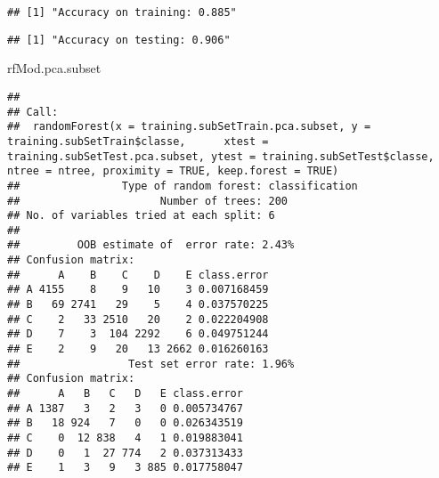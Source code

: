 \documentclass[]{article}
\newenvironment{Shaded}{\begin{snugshade}}{\end{snugshade}}
\newcommand{\DecValTok}[1]{\textcolor[rgb]{0.00,0.00,0.81}{#1}}
\newcommand{\KeywordTok}[1]{\textcolor[rgb]{0.13,0.29,0.53}{\textbf{#1}}}
\newcommand{\NormalTok}[1]{#1}
\newcommand{\OperatorTok}[1]{\textcolor[rgb]{0.81,0.36,0.00}{\textbf{#1}}}
\newcommand{\StringTok}[1]{\textcolor[rgb]{0.31,0.60,0.02}{#1}}
\begin{document}
\begin{Shaded}
\end{Shaded}

\begin{verbatim}
## [1] "Accuracy on training: 0.885"
\end{verbatim}

\begin{Shaded}
\end{Shaded}

\begin{verbatim}
## [1] "Accuracy on testing: 0.906"
\end{verbatim}

\begin{Shaded}
\begin{Highlighting}[]
\NormalTok{rfMod.pca.subset}
\end{Highlighting}
\end{Shaded}

\begin{verbatim}
## 
## Call:
##  randomForest(x = training.subSetTrain.pca.subset, y = training.subSetTrain$classe,      xtest = training.subSetTest.pca.subset, ytest = training.subSetTest$classe,      ntree = ntree, proximity = TRUE, keep.forest = TRUE) 
##                Type of random forest: classification
##                      Number of trees: 200
## No. of variables tried at each split: 6
## 
##         OOB estimate of  error rate: 2.43%
## Confusion matrix:
##      A    B    C    D    E class.error
## A 4155    8    9   10    3 0.007168459
## B   69 2741   29    5    4 0.037570225
## C    2   33 2510   20    2 0.022204908
## D    7    3  104 2292    6 0.049751244
## E    2    9   20   13 2662 0.016260163
##                 Test set error rate: 1.96%
## Confusion matrix:
##      A   B   C   D   E class.error
## A 1387   3   2   3   0 0.005734767
## B   18 924   7   0   0 0.026343519
## C    0  12 838   4   1 0.019883041
## D    0   1  27 774   2 0.037313433
## E    1   3   9   3 885 0.017758047
\end{verbatim}
\end{document}
